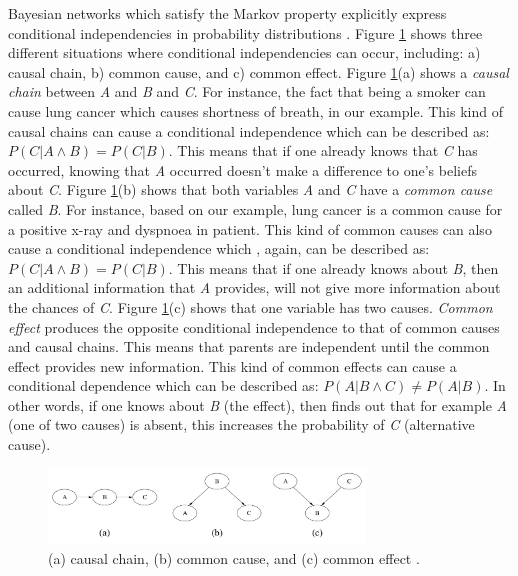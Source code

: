 \documentclass[11pt]{article}
\begin{document}
Bayesian networks which satisfy the Markov property explicitly express
conditional independencies in probability distributions \cite{korb:bayesian-ai}.
Figure \ref{fig:conditional-independence} shows three different situations where
conditional independencies can occur, including: a) causal chain, b) common
cause, and c) common effect. Figure \ref{fig:conditional-independence}(a) shows
a \textit{causal chain} between \textit{A} and \textit{B} and \textit{C}. For
instance, the fact that being a smoker can cause lung cancer which causes
shortness of breath, in our example. This kind of causal chains can cause
a conditional independence which can be described as: $P(C | A \wedge B) = P(C
| B)$. This means that if one already knows that \textit{C} has occurred,
knowing that \textit{A} occurred doesn’t make a difference to one's beliefs
about \textit{C}. Figure \ref{fig:conditional-independence}(b) shows that both
variables \textit{A} and \textit{C} have a \textit{common cause} called
\textit{B}. For instance, based on our example, lung cancer is a common cause
for a positive x-ray and dyspnoea in patient. This kind of common causes can
also cause a conditional independence which , again, can be described as: $P(C |
A \wedge B) = P(C | B)$. This means that if one already knows about \textit{B},
then an additional information that \textit{A} provides, will not give more
information about the chances of \textit{C}. Figure
\ref{fig:conditional-independence}(c) shows that one variable has two causes.
\textit{Common effect} produces the opposite conditional independence to that of
common causes and causal chains. This means that parents are independent until
the common effect provides new information. This kind of common effects can
cause a conditional dependence which can be described as: $P(A | B \wedge C)
\neq P(A | B)$. In other words, if one knows about \textit{B} (the effect), then
finds out that for example \textit{A} (one of two causes) is absent, this
increases the probability of \textit{C} (alternative cause).

\begin{figure}[tbh]
  \center
  \includegraphics[width=0.75\textwidth]{figure/conditional-independence.png}
  \caption{(a) causal chain, (b) common cause, and (c) common effect
  \cite{korb:bayesian-ai}.}
  \label{fig:conditional-independence}
\end{figure}
\end{document}
